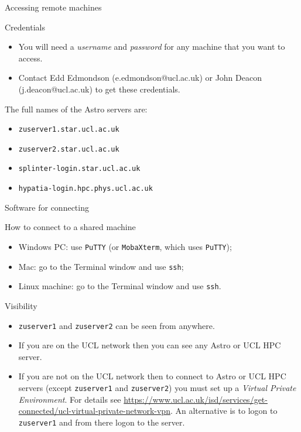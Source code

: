 \documentclass{beamer}
\newcommand{\command}[1]{\colorbox{light-gray}{\texttt{#1}}}
\begin{document}
\begin{frame}{Accessing remote machines}
  \begin{block}{Credentials}
    \begin{itemize}
      \item You will need a \textit{username} and \textit{password} for any machine that you want to access.
      \item Contact Edd Edmondson (e.edmondson@ucl.ac.uk) or John Deacon (j.deacon@ucl.ac.uk) to get these credentials.
    \end{itemize}
  \end{block}
  \begin{block}{The full names of the Astro servers are:}
    \begin{itemize}
      \item \texttt{zuserver1.star.ucl.ac.uk}
      \item \texttt{zuserver2.star.ucl.ac.uk}
      \item \texttt{splinter-login.star.ucl.ac.uk}
      \item \texttt{hypatia-login.hpc.phys.ucl.ac.uk}
    \end{itemize}
  \end{block}
\end{frame}


\begin{frame}{Software for connecting}
  \begin{block}{How to connect to a shared machine}
    \begin{itemize}
      \item Windows PC: use \command{PuTTY} (or \command{MobaXterm}, which uses \command{PuTTY});
      \item Mac: go to the Terminal window and use \command{ssh};
      \item Linux machine: go to the Terminal window and use \command{ssh}.
    \end{itemize}
  \end{block}
\end{frame}


\begin{frame}{Visibility}
  \begin{block}{}
    \begin{itemize}
    \item \texttt{zuserver1} and \texttt{zuserver2} can be seen from anywhere.
    \item If you are on the UCL network then you can see any Astro or UCL HPC server.
    \item If you are not on the UCL network then to connect to Astro or UCL HPC servers (except \texttt{zuserver1} and \texttt{zuserver2}) you must set up a \textit{Virtual Private Environment}. For details see \url{https://www.ucl.ac.uk/isd/services/get-connected/ucl-virtual-private-network-vpn}. An alternative is to logon to \texttt{zuserver1} and from there logon to the server.
    \end{itemize}
  \end{block}
\end{frame}
\end{document}
